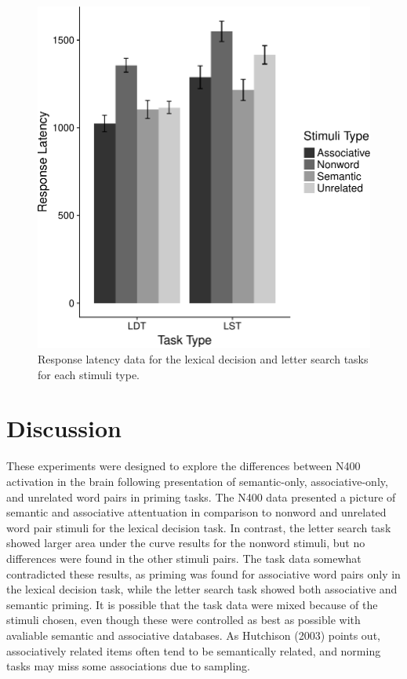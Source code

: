 \documentclass[english,man]{apa6}
\theoremstyle{definition}
\theoremstyle{definition}
\theoremstyle{definition}
\theoremstyle{remark}
\begin{document}
\begin{figure}
\centering
\includegraphics{BrainPaper_files/figure-latex/RT-graph-1.pdf}
\caption{\label{fig:RT-graph}Response latency data for the lexical decision
and letter search tasks for each stimuli type.}
\end{figure}

\section{Discussion}\label{discussion}

These experiments were designed to explore the differences between N400
activation in the brain following presentation of semantic-only,
associative-only, and unrelated word pairs in priming tasks. The N400
data presented a picture of semantic and associative attentuation in
comparison to nonword and unrelated word pair stimuli for the lexical
decision task. In contrast, the letter search task showed larger area
under the curve results for the nonword stimuli, but no differences were
found in the other stimuli pairs. The task data somewhat contradicted
these results, as priming was found for associative word pairs only in
the lexical decision task, while the letter search task showed both
associative and semantic priming. It is possible that the task data were
mixed because of the stimuli chosen, even though these were controlled
as best as possible with avaliable semantic and associative databases.
As Hutchison (2003) points out, associatively related items often tend
to be semantically related, and norming tasks may miss some associations
due to sampling.
\end{document}
